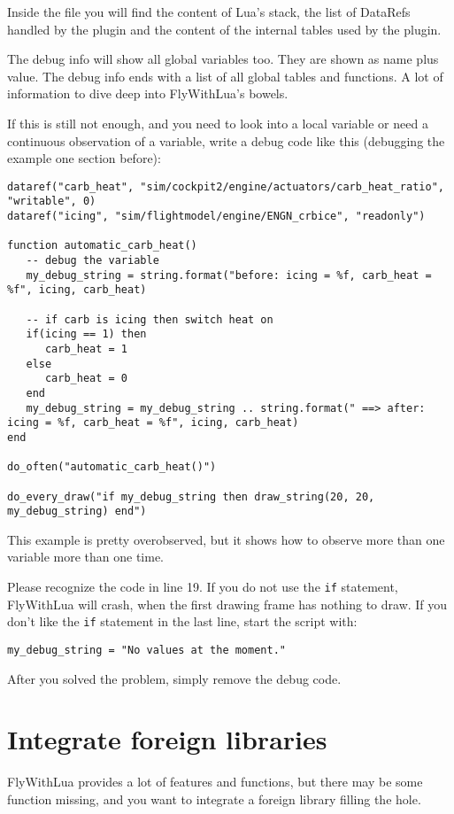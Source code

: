 \documentclass[11pt,parskip=half,a4paper]{scrartcl}
\begin{document}
Inside the file you will find the content of Lua's stack, the list of DataRefs handled by the plugin and the content of the internal tables used by the plugin.

The debug info will show all global variables too. They are shown as name plus value. The debug info ends with a list of all global tables and functions. A lot of information to dive deep into FlyWithLua's bowels.

If this is still not enough, and you need to look into a local variable or need a continuous observation of a variable, write a debug code like this (debugging the example one section before):

\begin{lstlisting}
dataref("carb_heat", "sim/cockpit2/engine/actuators/carb_heat_ratio", "writable", 0)
dataref("icing", "sim/flightmodel/engine/ENGN_crbice", "readonly")

function automatic_carb_heat()
   -- debug the variable
   my_debug_string = string.format("before: icing = %f, carb_heat = %f", icing, carb_heat)

   -- if carb is icing then switch heat on 
   if(icing == 1) then
      carb_heat = 1
   else
      carb_heat = 0
   end	
   my_debug_string = my_debug_string .. string.format(" ==> after: icing = %f, carb_heat = %f", icing, carb_heat)
end

do_often("automatic_carb_heat()")

do_every_draw("if my_debug_string then draw_string(20, 20, my_debug_string) end")\end{lstlisting}

This example is pretty overobserved, but it shows how to observe more than one variable more than one time.

Please recognize the code in line 19. If you do not use the \verb|if| statement, FlyWithLua will crash, when the first drawing frame has nothing to draw. If you don't like the \verb|if| statement in the last line, start the script with:

\verb|my_debug_string = "No values at the moment."|

After you solved the problem, simply remove the debug code.

\section{Integrate foreign libraries}

FlyWithLua provides a lot of features and functions, but there may be some function missing, and you want to integrate a foreign library filling the hole.
\end{document}
